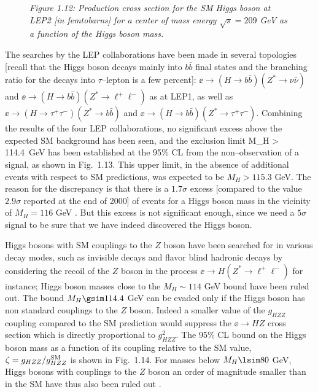 \begin{figure}[htbp]
\begin{center}
\vspace*{-.8cm}
\hspace*{-2cm}
\end{center}
\vspace*{-15.3cm}
{\it Figure 1.12: Production cross section for the SM Higgs boson at LEP2 [in
femtobarns] for a center of mass energy $\sqrt{s}=209$ GeV as a function of 
the Higgs boson mass.}
\vspace*{-3mm}
\end{figure} 

The searches by the LEP collaborations have been made in several topologies 
[recall that the Higgs boson decays mainly into $b\bar{b}$ final states and the 
branching ratio for the decays into $\tau$--lepton is a few percent]: 
$\ee \to  (H \to b\bar{b}) (Z^* \to \nu \bar \nu)$ and 
$\ee \to  (H \to b\bar{b}) (Z^* \to \ell^+ \ell^-)$ as at LEP1, as well as 
$\ee \to  (H \to \tau^+\tau^-) (Z^* \to b\bar{b})$ and
$\ee \to  (H \to b\bar{b}) (Z^* \to \tau^+ \tau^-)$.  
Combining the results of the four LEP collaborations, no significant excess 
above the expected SM background has been seen, and the exclusion  limit 
\cite{LEP2-Higgs-exp}
\beq 
M_H > 114.4~{\rm GeV} 
\eeq 
has been established at the 95\% CL from the non--observation of a signal, as 
shown in Fig.~1.13.  This upper limit, in the absence of additional 
events with respect to SM predictions, was expected to be $M_H>115.3$ GeV.  The
reason for the discrepancy is that there is a $1.7\sigma$ excess [compared to
the value  $2.9\sigma$ reported at the end of 2000] of events for a Higgs boson
mass in the vicinity of $M_H=116$ GeV \cite{LEP2-Higgs-exp}. But this excess 
is not significant enough, since  we need a $5\sigma$  signal to be sure that 
we have indeed discovered the Higgs boson.\s

Higgs bosons with SM couplings to the $Z$ boson have been searched for in
various decay modes, such as invisible decays \cite{LEP2-Higgs-ind} and flavor 
blind hadronic decays \cite{LEP2-Higgs-fbd} by considering the recoil of the 
$Z$ boson in the process $\ee \to  H (Z^* \to
\ell^+ \ell^-)$ for instance; Higgs boson masses close to the $M_H\sim 114$ GeV 
bound have been ruled out.  The bound $M_H \gsim 114.4$
GeV can be evaded only if the Higgs boson has non standard couplings to the $Z$
boson. Indeed a smaller value of the $g_{HZZ}$ coupling compared to the SM
prediction would suppress the  $\ee \to HZ$ cross section which is directly
proportional to $g_{HZZ}^2$. The 95\% CL bound on the Higgs boson mass as a
function of its coupling relative to the SM value, $\zeta=g_{HZZ}/g_{HZZ}^{\rm
SM}$ is shown in Fig.~1.14. For masses below $M_H \lsim 80$ GeV, Higgs bosons
with couplings to the $Z$ boson an order of magnitude smaller than in the SM
have thus also been ruled out \cite{LEP2-Higgs-exp}.  


